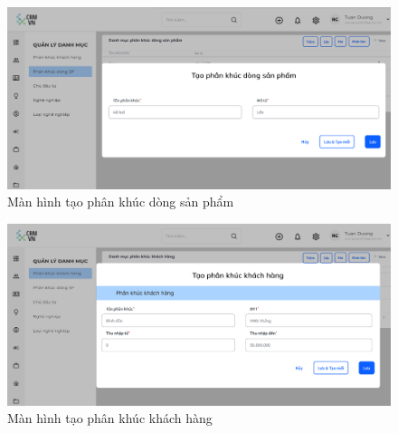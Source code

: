 \documentclass[12pt,a4paper]{article}
\begin{document}
\begin{enumerate}
\begin{itemize}
            \begin{figure}[H]
                \centering \includegraphics[width=\textwidth]{Img/Nguyet/Danhmuc/taopkdsp.png}
                \vspace{0.5cm}
                \caption{Màn hình tạo phân khúc dòng sản phẩm}
                \label{taodsp}
            \end{figure}


            \begin{figure}[H]
                \centering \includegraphics[width=\textwidth]{Img/Nguyet/Danhmuc/taopkkh.png}
                \vspace{0.5cm}
                \caption{Màn hình tạo phân khúc khách hàng}
                \label{taonnn}
            \end{figure}


\end{itemize}
\end{enumerate}
\end{document}
